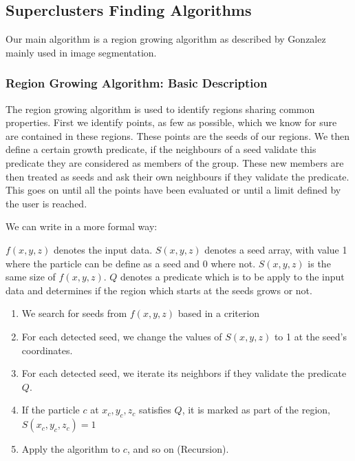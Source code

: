 \documentclass[12pt]{article}
\begin{document}
\subsection{Superclusters Finding Algorithms}\label{sec:algorithms}

Our main algorithm is a region growing algorithm
 as described by Gonzalez
  \cite{gonzalez_digital_2008} mainly used in
   image segmentation.
\subsubsection{Region Growing Algorithm: Basic Description}

\begin{par}
The region growing algorithm is used to identify regions sharing common properties. First we identify points, as few as possible, which we know for sure are contained in these regions. These points are the seeds of our regions. We then define a certain growth predicate, if the neighbours of a seed validate this predicate they are considered as members of the group. These new members are then treated as seeds and ask their own neighbours if they validate the predicate. This goes on until all the points have been evaluated or until a limit defined by the user is reached.
\end{par}

\begin{par}
We can write in a more formal way:
\end{par}

\begin{par}
$f(x,y,z)$ denotes the input data. $S(x,y,z)$ denotes a seed array, with
value 1 where the particle can be define as a seed and 0 where not. $S(x,y,z)$ is the
same size of $f(x,y,z)$. $Q$ denotes a predicate which is to be apply to the
input data and determines if the region which
 starts at the seeds grows or
not. 
\end{par}

\begin{enumerate}
	\item We search for seeds from $f(x,y,z)$ based in a criterion
	\item For each detected seed, we change the values of $S(x,y,z)$ to 1 at the seed's coordinates.
	\item For each detected seed, we iterate its neighbors if they validate the predicate $Q$.
    \item If the particle $c$ at $x_c, y_c, z_c$ satisfies $Q$, it is marked as part of the region, $S(x_c, y_c, z_c) = 1$
    \item Apply the algorithm to $c$, and so on
     (Recursion).
\end{enumerate}
\end{document}
